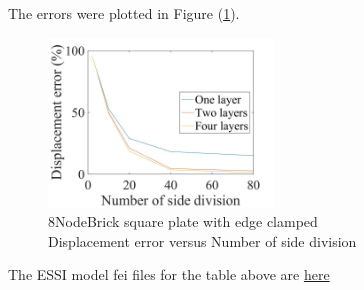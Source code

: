\documentclass[fleqn,11pt,letter]{article}
\begin{document}
The errors were plotted in Figure (\ref{fig 8NodeBrick square plate with edge clamped}).
\begin{figure}[H]
    \centering
    \includegraphics[width=6cm]{../Figure_files/8NodeBrick/error8brick_square_plate_clamped.jpeg}
  \captionsetup{justification=centering,margin=3cm}
  \caption{8NodeBrick square plate with edge clamped\\
      Displacement error   versus   Number of side division}
  \label{fig 8NodeBrick square plate with edge clamped}
\end{figure}



The ESSI model fei files for the table above are \href{https://github.com/yuan-energy/ESSI_Verification/blob/master/8NodeBrick/square_plate_clamped/square_plate_clamped.tar.gz?raw=true}{here}










\end{document}
